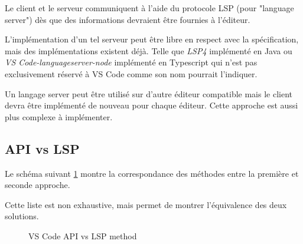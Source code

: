 \documentclass[
    iict, %
    il, %
]{heig-tb}
\begin{document}
\vspace{\parskip}

Le client et le serveur communiquent à l'aide du protocole LSP (pour "language server") dès que des informations devraient être fournies à l'éditeur.

L'implémentation d'un tel serveur peut être libre en respect avec la spécification, mais des implémentations existent déjà. Telle que \emph{LSP4} implémenté en Java ou \emph{VS Code-languageserver-node}
implémenté en Typescript qui n'est pas exclusivement réservé à VS Code comme son nom pourrait l'indiquer.

Un langage server peut être utilisé sur d'autre éditeur compatible mais le client devra être implémenté de nouveau pour chaque éditeur.
Cette approche est aussi plus complexe à implémenter.

\subsection{API vs LSP}\label{api vs lsp}

Le schéma suivant \ref{api vs lsp} montre la correspondance des méthodes entre la première et seconde approche.

Cette liste est non exhaustive, mais permet de montrer l'équivalence des deux solutions.

\begin{figure}[!ht]
    \begin{center}
    \end{center}
    \caption[API vs LSP]{\label{api vs lsp} VS Code API vs LSP method}
\end{figure}
\end{document}
